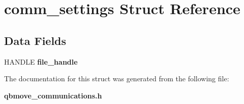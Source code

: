 \section{comm\+\_\+settings Struct Reference}
\label{structcomm__settings}
\subsection*{Data Fields}
\begin{DoxyCompactItemize}
\item 
\mbox{\label{structcomm__settings_a577bde85e1667e1d14573add870f6fce}} 
H\+A\+N\+D\+LE {\bfseries file\+\_\+handle}
\end{DoxyCompactItemize}


The documentation for this struct was generated from the following file\+:\begin{DoxyCompactItemize}
\item 
\textbf{ qbmove\+\_\+communications.\+h}\end{DoxyCompactItemize}
